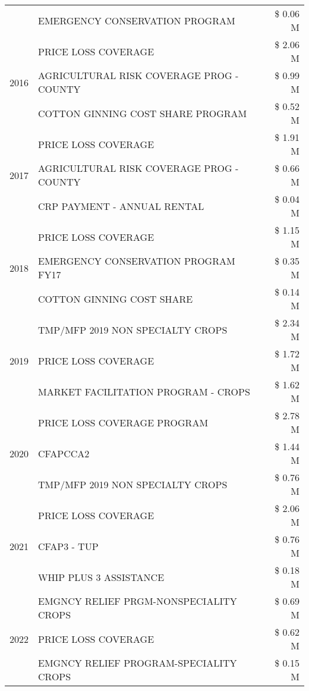 \begin{tabular}{llr}
 & EMERGENCY CONSERVATION PROGRAM & \$ 0.06 M \\
\cline{1-3}
\multirow[t]{3}{*}{2016} & PRICE LOSS COVERAGE & \$ 2.06 M \\
 & AGRICULTURAL RISK COVERAGE PROG - COUNTY & \$ 0.99 M \\
 & COTTON GINNING COST SHARE PROGRAM & \$ 0.52 M \\
\cline{1-3}
\multirow[t]{3}{*}{2017} & PRICE LOSS COVERAGE & \$ 1.91 M \\
 & AGRICULTURAL RISK COVERAGE PROG - COUNTY & \$ 0.66 M \\
 & CRP PAYMENT - ANNUAL RENTAL & \$ 0.04 M \\
\cline{1-3}
\multirow[t]{3}{*}{2018} & PRICE LOSS COVERAGE & \$ 1.15 M \\
 & EMERGENCY CONSERVATION PROGRAM FY17 & \$ 0.35 M \\
 & COTTON GINNING COST SHARE & \$ 0.14 M \\
\cline{1-3}
\multirow[t]{3}{*}{2019} & TMP/MFP 2019 NON SPECIALTY CROPS & \$ 2.34 M \\
 & PRICE LOSS COVERAGE & \$ 1.72 M \\
 & MARKET FACILITATION PROGRAM - CROPS & \$ 1.62 M \\
\cline{1-3}
\multirow[t]{3}{*}{2020} & PRICE LOSS COVERAGE PROGRAM & \$ 2.78 M \\
 & CFAPCCA2 & \$ 1.44 M \\
 & TMP/MFP 2019 NON SPECIALTY CROPS & \$ 0.76 M \\
\cline{1-3}
\multirow[t]{3}{*}{2021} & PRICE LOSS COVERAGE & \$ 2.06 M \\
 & CFAP3 - TUP & \$ 0.76 M \\
 & WHIP PLUS 3 ASSISTANCE & \$ 0.18 M \\
\cline{1-3}
\multirow[t]{3}{*}{2022} & EMGNCY RELIEF PRGM-NONSPECIALITY CROPS & \$ 0.69 M \\
 & PRICE LOSS COVERAGE & \$ 0.62 M \\
 & EMGNCY RELIEF PROGRAM-SPECIALITY CROPS & \$ 0.15 M \\
\cline{1-3}
\bottomrule
\end{tabular}
